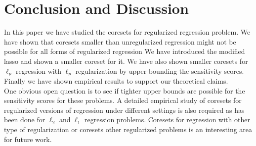\section{Conclusion and Discussion}
In this paper we have studied the coresets for regularized regression problem. We have shown that coresets smaller than unregularized regression might not be possible for all forms of regularized regression We have introduced the modified lasso and shown a smaller coreset for it. We have also shown smaller coresets for $\ell_p$ regression with $\ell_p$ regularization by upper bounding the sensitivity scores. Finally we have shown empirical results to support our theoretical claims.\\
One obvious open question is to see if tighter upper bounds are possible for the sensitivity scores for these problems. A detailed empirical study of coresets for regularized versions of regression under different settings is also required as has been done for $\ell_2$ and $\ell_1$ regression problems. Coresets for regression with other type of regularization or coresets other regularized problems is an interesting area for future work.